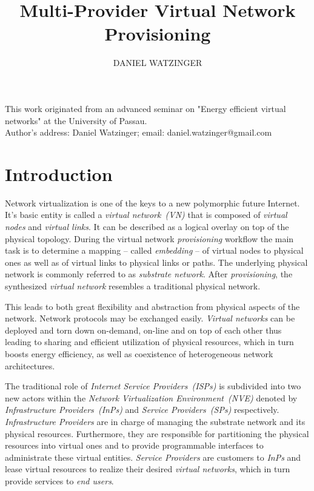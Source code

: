 \documentclass[prodmode,acmtomccap]{acmlarge}
\title{Multi-Provider Virtual Network Provisioning}
\author{DANIEL WATZINGER\affil{University of Passau}}
\begin{document}
\begin{bottomstuff}
This work originated from an advanced seminar on "Energy efficient virtual networks" at the University of Passau.\\
Author's address: Daniel Watzinger; email: daniel.watzinger@gmail.com
\end{bottomstuff}
\maketitle

\section{Introduction}
\label{sec:introduction}

Network virtualization is one of the keys to a new polymorphic future Internet. It's basic entity is called a 
\emph{virtual network~(VN)} that is composed of \emph{virtual nodes} and \emph{virtual links}. It can be described as
a logical overlay on top of the physical topology.
During the virtual network \emph{provisioning} workflow the main task is to determine a mapping 
-- called \emph{embedding} -- of virtual nodes to physical ones as well as of virtual links to physical links or paths.
The underlying physical network is commonly referred to as \emph{substrate network}.
After \emph{provisioning}, the synthesized \emph{virtual network} resembles a traditional physical network.

This leads to both great flexibility and abstraction from physical aspects of the network. Network protocols may be exchanged easily. 
\emph{Virtual networks} can be deployed and torn down on-demand, 
on-line and on top of each other thus leading to sharing and efficient utilization of physical resources, which in turn boosts energy efficiency, 
as well as coexistence of heterogeneous network architectures.

The traditional role of \emph{Internet Service Providers~(ISPs)} is subdivided into two new actors within the \emph{Network Virtualization Environment~(NVE)} denoted by 
\emph{Infrastructure Providers~(InPs)} and \emph{Service Providers~(SPs)} respectively.
\emph{Infrastructure Providers} are in charge of managing the substrate network and its physical resources. Furthermore, they are responsible for partitioning the physical resources
into virtual ones and to provide programmable interfaces to administrate these virtual entities.
\emph{Service Providers} are customers to \emph{InPs} and lease virtual resources to realize their desired \emph{virtual networks}, which in turn provide services to \emph{end users}.
\end{document}
